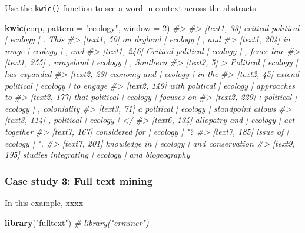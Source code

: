 \documentclass[author-year, review, 11pt]{components/elsarticle} %
\newenvironment{Shaded}{\begin{snugshade}}{\end{snugshade}}
\newcommand{\CommentTok}[1]{\textcolor[rgb]{0.56,0.35,0.01}{\textit{#1}}}
\newcommand{\DataTypeTok}[1]{\textcolor[rgb]{0.13,0.29,0.53}{#1}}
\newcommand{\DecValTok}[1]{\textcolor[rgb]{0.00,0.00,0.81}{#1}}
\newcommand{\KeywordTok}[1]{\textcolor[rgb]{0.13,0.29,0.53}{\textbf{#1}}}
\newcommand{\NormalTok}[1]{#1}
\newcommand{\StringTok}[1]{\textcolor[rgb]{0.31,0.60,0.02}{#1}}
\begin{document}
Use the \texttt{kwic()} function to see a word in context across the
abstracts

\begin{Shaded}
\begin{Highlighting}[]
\KeywordTok{kwic}\NormalTok{(corp, }\DataTypeTok{pattern =} \StringTok{"ecology"}\NormalTok{, }\DataTypeTok{window =} \DecValTok{2}\NormalTok{)}
\CommentTok{#>                                                                }
\CommentTok{#>   [text1, 33]  critical political | ecology | . This           }
\CommentTok{#>   [text1, 50]          on dryland | ecology | , and            }
\CommentTok{#>  [text1, 204]            in range | ecology | , and            }
\CommentTok{#>  [text1, 246]  Critical political | ecology | , fence-line     }
\CommentTok{#>  [text1, 255]         , rangeland | ecology | , Southern       }
\CommentTok{#>    [text2, 5]         > Political | ecology | has expanded     }
\CommentTok{#>   [text2, 23]         economy and | ecology | in the           }
\CommentTok{#>   [text2, 45]    extend political | ecology | to engage        }
\CommentTok{#>  [text2, 149]      with political | ecology | approaches to    }
\CommentTok{#>  [text2, 177]      that political | ecology | focuses on       }
\CommentTok{#>  [text2, 229]         : political | ecology | , coloniality    }
\CommentTok{#>   [text3, 71]         a political | ecology | standpoint allows}
\CommentTok{#>  [text3, 114]         , political | ecology | </               }
\CommentTok{#>  [text6, 134]       allopatry and | ecology | act together     }
\CommentTok{#>  [text7, 167]      considered for | ecology | "?               }
\CommentTok{#>  [text7, 185]            issue of | ecology | ",               }
\CommentTok{#>  [text7, 201]        knowledge in | ecology | and conservation }
\CommentTok{#>  [text9, 195] studies integrating | ecology | and biogeography}
\end{Highlighting}
\end{Shaded}

\hypertarget{case-study-3-full-text-mining}{%
\subsubsection{Case study 3: Full text
mining}\label{case-study-3-full-text-mining}}

In this example, xxxx

\begin{Shaded}
\begin{Highlighting}[]
\KeywordTok{library}\NormalTok{(}\StringTok{"fulltext"}\NormalTok{)}
\CommentTok{# library("crminer")}
\end{Highlighting}
\end{Shaded}
\end{document}
